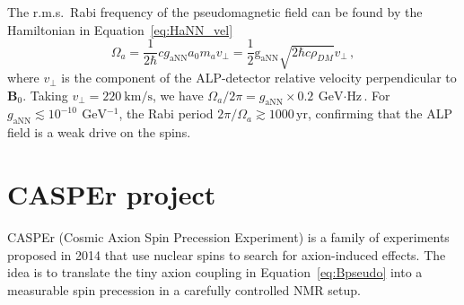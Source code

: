 The r.m.s.\ Rabi frequency of the pseudomagnetic field can be found by the Hamiltonian in Equation~\eqref{eq:HaNN_vel} \cite{Centers2021Stochastic,Yuzhe2023_FrequencyScanning}
\begin{equation}
    \Omega_a = \dfrac{1}{2\hbar} c g_\mathrm{{aNN}} a_0 m_a v_{\bot} = \dfrac{1}{2} \mathrm{g_{aNN}} \sqrt{2\hbar c \rho_{DM}} v_{\bot}
    \,,\label{eq:Omega_a}
\end{equation}
where $v_{\bot}$ is the component of the ALP-detector relative velocity perpendicular to $\mathbf{B}_0$. 
Taking $v_{\bot} = \SI{220}{\km\per\second}$, we have $\Omega_a/2\pi = g_{\mathrm{aNN}} \times \SI{0.2}{\GeV\cdot\Hz}$. 
For $g_{\mathrm{aNN}} \lesssim 10^{-10}\,\SI{}{\GeV^{-1}}$, the Rabi period $2\pi/\Omega_a \gtrsim 1000\,\mathrm{yr}$, confirming that the ALP field is a weak drive on the spins.







\section{CASPEr project}\label{sec:intro:CASPEr}


CASPEr (Cosmic Axion Spin Precession Experiment) is a family of experiments proposed in 2014 \cite{CASPErProposal2014} that use nuclear spins to search for axion-induced effects. The idea is to translate the tiny axion coupling in Equation~\eqref{eq:Bpseudo} into a measurable spin precession in a carefully controlled NMR setup.

